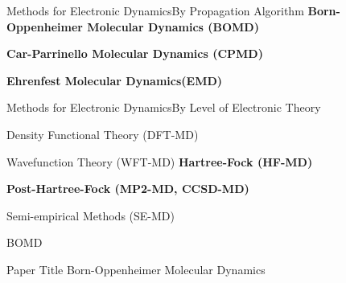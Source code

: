 \begin{frame}{Methods for Electronic Dynamics}{By Propagation Algorithm}
    \textbf{Born-Oppenheimer Molecular Dynamics (BOMD)}
    \vspace{1em}
    
    \textbf{Car-Parrinello Molecular Dynamics (CPMD)}
    \vspace{1em}
    
    \textbf{Ehrenfest Molecular Dynamics(EMD)}
\end{frame}

\begin{frame}{Methods for Electronic Dynamics}{By Level of Electronic Theory}
    \begin{block}{Density Functional Theory (DFT-MD)}
    \end{block}
    
    \begin{block}{Wavefunction Theory (WFT-MD)}
        \textbf{Hartree-Fock (HF-MD)}
        \vspace{0.5em}
        
        \textbf{Post-Hartree-Fock (MP2-MD, CCSD-MD)}
    \end{block}
    
    \begin{block}{Semi-empirical Methods (SE-MD)}
    \end{block}
\end{frame}


\begin{frame}{BOMD}
	\begin{block}{Paper Title}
  Born-Oppenheimer Molecular Dynamics	
	\end{block}
\end{frame}

